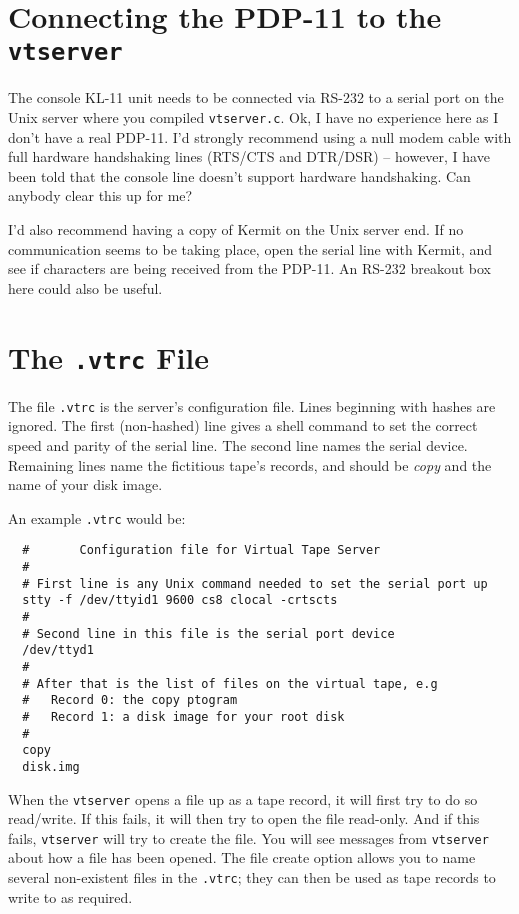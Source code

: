 \section{Connecting the PDP-11 to the {\tt vtserver}}

The console KL-11 unit 
needs to be connected via RS-232 to a serial port on the Unix server where
you compiled {\tt vtserver.c}. Ok, I have no experience here as I don't have a
real PDP-11. I'd strongly recommend using a null modem cable with full hardware
handshaking lines (RTS/CTS and DTR/DSR) -- however, I have been told that
the console line doesn't support hardware handshaking. Can anybody clear
this up for me?

I'd also recommend having a copy of Kermit on the Unix server end. If no
communication seems to be taking place, open the serial line with Kermit,
and see if characters are being received from the PDP-11. An RS-232
breakout box here could also be useful.

\section{The {\tt .vtrc} File}

The file {\tt .vtrc} is the server's configuration file. Lines beginning
with hashes are ignored. The first (non-hashed) line gives a shell command
to set the correct speed and parity of the serial line. The second line names
the serial device. Remaining lines name the fictitious tape's records, and
should be {\it copy} and the name of your disk image.

An example {\tt .vtrc} would be:

\begin{verbatim}
  #       Configuration file for Virtual Tape Server
  #
  # First line is any Unix command needed to set the serial port up
  stty -f /dev/ttyid1 9600 cs8 clocal -crtscts
  #
  # Second line in this file is the serial port device
  /dev/ttyd1
  #
  # After that is the list of files on the virtual tape, e.g
  #   Record 0: the copy ptogram
  #   Record 1: a disk image for your root disk
  #
  copy
  disk.img
\end{verbatim}

When the {\tt vtserver} opens a file up as a tape record, it will first
try to do so read/write. If this fails, it will then try to open
the file read-only. And if this fails, {\tt vtserver} will try to create
the file. You will see messages from {\tt vtserver} about how a file has been
opened. The file create option allows you to name several non-existent
files in the {\tt .vtrc}; they can then be used as tape records to write
to as required.

